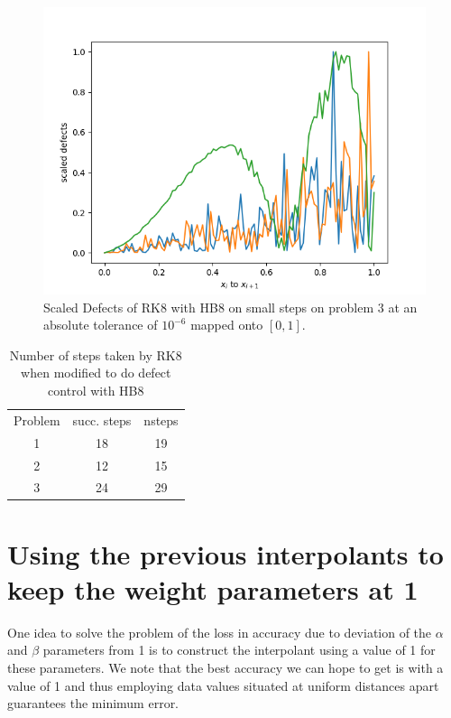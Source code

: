 \begin{figure}[H]
\centering
\includegraphics[width=0.7\linewidth]{./figures/rk8_with_hb8_p3_scaled_defects_small_steps}
\caption{Scaled Defects of RK8 with HB8 on small steps on problem 3 at an absolute tolerance of $10^{-6}$ mapped onto $[0, 1]$.}
\label{fig:rk8_with_hb8_p3_scaled_defects_small_steps}
\end{figure}

\begin{table}[h]
\caption {Number of steps taken by RK8 when modified to do defect control with HB8} \label{tab:rk8_with_hb8_nsteps}
\begin{center}
\begin{tabular}{ c c c } 
Problem & succ. steps & nsteps \\ 
1       & 18             &        19 \\ 
2       & 12             &        15 \\
3       & 24             &        29 \\
\end{tabular}
\end{center}
\end{table}

\section{Using the previous interpolants to keep the weight parameters at 1}
\label{section:keeping_alpha_at_1}
One idea to solve the problem of the loss in accuracy due to deviation of the $\alpha$ and $\beta$ parameters from 1 is to construct the interpolant using a value of 1 for these parameters. We note that the best accuracy we can hope to get is with a value of 1 and thus employing data values situated at uniform distances apart guarantees the minimum error.

